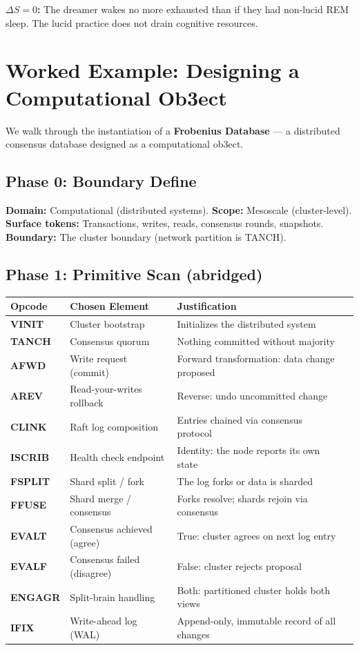 \documentclass[12pt,a4paper]{article}
\begin{document}
\textbf{$\Delta S = 0$:} The dreamer wakes no more exhausted than if they had
non-lucid REM sleep. The lucid practice does not drain cognitive resources.

\section{Worked Example: Designing a Computational Ob3ect}

We walk through the instantiation of a \textbf{Frobenius Database} — a distributed
consensus database designed as a computational ob3ect.

\subsection*{Phase 0: Boundary Define}

\textbf{Domain:} Computational (distributed systems). \textbf{Scope:} Mesoscale
(cluster-level). \textbf{Surface tokens:} Transactions, writes, reads, consensus
rounds, snapshots. \textbf{Boundary:} The cluster boundary (network partition is
TANCH).

\subsection*{Phase 1: Primitive Scan (abridged)}

{\small
\begin{tabularx}{\textwidth}{>{\bfseries}p{2cm} p{3.8cm} p{6.2cm}X}
\toprule
{\bf Opcode} & {\bf Chosen Element} & {\bf Justification} \\
\midrule
VINIT & Cluster bootstrap & Initializes the distributed system \\
TANCH & Consensus quorum & Nothing committed without majority \\
AFWD & Write request (commit) & Forward transformation: data change proposed \\
AREV & Read-your-writes rollback & Reverse: undo uncommitted change \\
CLINK & Raft log composition & Entries chained via consensus protocol \\
ISCRIB & Health check endpoint & Identity: the node reports its own state \\
FSPLIT & Shard split / fork & The log forks or data is sharded \\
FFUSE & Shard merge / consensus & Forks resolve; shards rejoin via consensus \\
EVALT & Consensus achieved (agree) & True: cluster agrees on next log entry \\
EVALF & Consensus failed (disagree) & False: cluster rejects proposal \\
ENGAGR & Split-brain handling & Both: partitioned cluster holds both views \\
IFIX & Write-ahead log (WAL) & Append-only, immutable record of all changes \\
\bottomrule
\end{tabularx}
}
\end{document}

